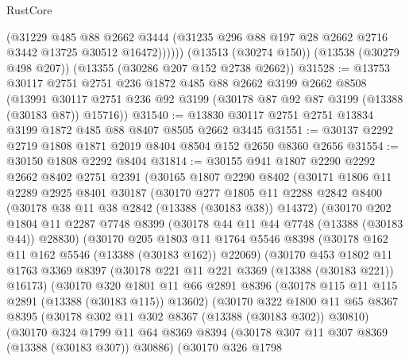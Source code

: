 \begin{lexlean}{RustCore}
\begin{coremodule}
            (@31229
              @485
              @88
              @2662
              @3444
              (@31235 @296 @88 @197 @28 @2662 @2716 @3442 @13725 @30512 @16472))))))
    (@13513 (@30274 @150))
    (@13538 (@30279 @498 @207))
    (@13355 (@30286 @207 @152 @2738 @2662))
@31528 := @13753
    @30117
    @2751
    @2751
    @236
    @1872
    @485
    @88
    @2662
    @3199
    @2662
    @8508
    (@13991 @30117 @2751 @236 @92 @3199 (@30178 @87 @92 @87 @3199 (@13388 (@30183 @87)) @15716))
@31540 := @13830 @30117 @2751 @2751 @13834 @3199 @1872 @485 @88 @8407 @8505 @2662 @3445
@31551 := @30137 @2292 @2719 @1808 @1871 @2019 @8404 @8504 @152 @2650 @8360 @2656
@31554 := @30150 @1808 @2292 @8404
@31814 := @30155
    @941
    @1807
    @2290
    @2292
    @2662
    @8402
    @2751
    @2391
    (@30165
      @1807
      @2290
      @8402
      (@30171
        @1806
        @11
        @2289
        @2925
        @8401
        @30187
        (@30170
          @277
          @1805
          @11
          @2288
          @2842
          @8400
          (@30178 @38 @11 @38 @2842 (@13388 (@30183 @38)) @14372)
          (@30170
            @202
            @1804
            @11
            @2287
            @7748
            @8399
            (@30178 @44 @11 @44 @7748 (@13388 (@30183 @44)) @28830)
            (@30170
              @205
              @1803
              @11
              @1764
              @5546
              @8398
              (@30178 @162 @11 @162 @5546 (@13388 (@30183 @162)) @22069)
              (@30170
                @453
                @1802
                @11
                @1763
                @3369
                @8397
                (@30178 @221 @11 @221 @3369 (@13388 (@30183 @221)) @16173)
                (@30170
                  @320
                  @1801
                  @11
                  @66
                  @2891
                  @8396
                  (@30178 @115 @11 @115 @2891 (@13388 (@30183 @115)) @13602)
                  (@30170
                    @322
                    @1800
                    @11
                    @65
                    @8367
                    @8395
                    (@30178 @302 @11 @302 @8367 (@13388 (@30183 @302)) @30810)
                    (@30170
                      @324
                      @1799
                      @11
                      @64
                      @8369
                      @8394
                      (@30178 @307 @11 @307 @8369 (@13388 (@30183 @307)) @30886)
                      (@30170
                        @326
                        @1798

\end{coremodule}
\end{lexlean}
